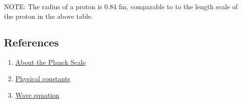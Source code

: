 NOTE: The radius of a proton is 0.84 fm, comparable to to the length scale of the proton in the above table.



\subsection{References}

\begin{enumerate}

\item \href{https://newt.phys.unsw.edu.au/einsteinlight/jw/module6_Planck.htm}{About the Planck Scale}

\item \href{http://newton.ex.ac.uk/research/qsystems/collabs/constants.html}{Physical constants}

\item \href{https://www.math.upenn.edu/~deturck/m425/m425-dalembert.pdf}{Wave equation}

\end{enumerate}
